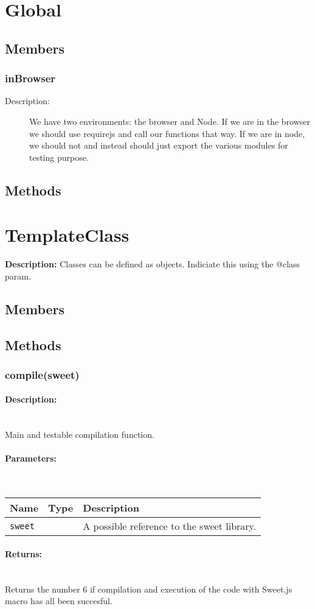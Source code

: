 \section{Global} 
\subsection{Members} 
\subsubsection{inBrowser} 
\begin{description} 
\item[Description:]We have two environments: the browser and Node. If we are in the browser we should use requirejs and call our functions that way.
If we are in node, we should not and instead should just export the various modules for testing purpose.
\end{description} 
\subsection{Methods} 
\section{TemplateClass} 
\textbf{Description: }Classes can be defined as objects. Indiciate this using the @class param.
\subsection{Members} 
\subsection{Methods} 
\subsubsection{compile(sweet)} 
\paragraph{Description:} \hfill \\ 
Main and testable compilation function.
\paragraph{Parameters:} \hfill \\ 
\begin{tabular}{|l|l|l|}
\hline
\textbf{Name} & \textbf{Type} & \textbf{Description} \\ 
\hline
\texttt{sweet} &  & A possible reference to the sweet library.\\ 
\hline
\end{tabular}
\paragraph{Returns:} \hfill \\ 
Returns the number 6 if compilation and execution of the code with Sweet.js macro has all been succesful.\\ 
